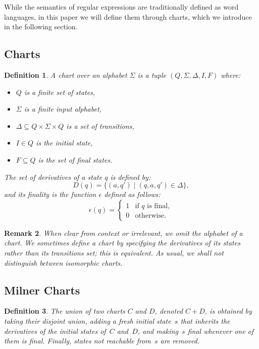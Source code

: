 \documentclass{article}
\newtheorem{definition}{Definition}[section]
\newtheorem{remark}[definition]{Remark}
\begin{document}
While the semantics of regular expressions are traditionally defined as word languages, in this paper we will define them through charts, which we introduce in the following section.

\subsection{Charts}
\begin{definition} 
A \emph{chart} over an alphabet $\Sigma$ is a tuple $(Q, \Sigma, \Delta, I, F)$ where:
\begin{itemize}
    \item $Q$ is a finite set of \emph{states},
    \item $\Sigma$ is a finite input alphabet,
    \item $\Delta \subseteq Q \times \Sigma \times Q$ is a set of \emph{transitions},
    \item $I \in Q$ is the \emph{initial} state,
    \item $F \subseteq Q$ is the set of \emph{final} states.
\end{itemize}
The set of derivatives  of a state $q$ is defined by:
\[
D(q)=\{(a,q')\mid(q,a,q')\in\Delta\},
\]
and its finality is the function $\epsilon$ defined as follows:
\[
\epsilon(q)=
\begin{cases}
1 & \text{if $q$ is final},\\
0 & \text{otherwise.}
\end{cases}
\]
\end{definition}



\begin{remark}
When clear from context or irrelevant, we omit the alphabet of a chart.
We sometimes define a chart by specifying the derivatives of its states rather than its 
transitions set; this is equivalent. As usual, we shall not distinguish between isomorphic charts. 
\end{remark}

\subsection{Milner Charts}




\begin{definition}
The \emph{union} of two charts $C$ and $D$, denoted $C + D$, 
is obtained by taking their disjoint union, adding a fresh initial state~$s$ 
that inherits the derivatives of the initial states of~$C$ and~$D$, 
and making~$s$ final whenever one of them is final.
Finally, states not reachable from~$s$ are removed.
\end{definition}
\end{document}

